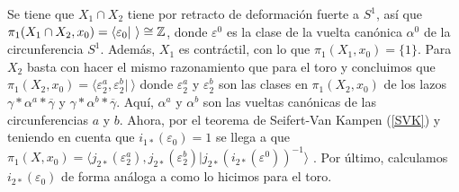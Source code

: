 \documentclass[GTS.tex]{subfiles}
\begin{document}
\begin{ej}
\begin{itemize}
Se tiene que $X_1\cap X_2$ tiene por retracto de deformación fuerte a $S^1$, así que $\pi_1(X_1\cap X_2,x_0)=\langle\varepsilon_0|\ \rangle \cong\mathbb{Z}$, 
donde $\varepsilon^0$ es la clase de la vuelta canónica $\alpha^0$ de la circunferencia $S^1$. Además, $X_1$ es contráctil, con lo que $\pi_1(X_1,x_0)=\{1\}$. Para $X_2$ basta con hacer el mismo razonamiento que para el toro y concluimos que $\pi_1(X_2,x_0)=\langle \varepsilon_2^a,\varepsilon_2^b|\ \rangle$ donde $\varepsilon_2^a$ y $\varepsilon_2^b$ son las clases en $\pi_1(X_2,x_0)$ de los lazos $\gamma*\alpha^a*\overline{\gamma}$ y $\gamma*\alpha^b*\overline{\gamma}$. Aquí, $\alpha^a$ y $\alpha^b$ son las vueltas canónicas de las circunferencias $a$ y $b$. Ahora, por el teorema de Seifert-Van Kampen (\ref{SVK}) y teniendo en cuenta que $i_{1*}(\varepsilon_0)=1$ se llega a que $\pi_1(X,x_0)=\langle j_{2*}(\varepsilon_2^a),j_{2*}(\varepsilon_2^b)|j_{2*}(i_{2*}(\varepsilon^0))^{-1}\rangle$ . Por último, calculamos $i_{2*}(\varepsilon_0)$ de forma análoga a como lo hicimos para el toro.

\end{itemize}
\end{ej}
\end{document}
